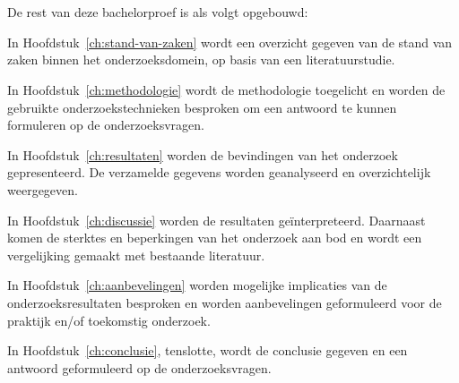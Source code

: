 \section{}%
\label{sec:opzet-bachelorproef}

De rest van deze bachelorproef is als volgt opgebouwd:

In Hoofdstuk~\ref{ch:stand-van-zaken} wordt een overzicht gegeven van de stand van zaken binnen het onderzoeksdomein, op basis van een literatuurstudie.

In Hoofdstuk~\ref{ch:methodologie} wordt de methodologie toegelicht en worden de gebruikte onderzoekstechnieken besproken om een antwoord te kunnen formuleren op de onderzoeksvragen.

In Hoofdstuk~\ref{ch:resultaten} worden de bevindingen van het onderzoek gepresenteerd. De verzamelde gegevens worden geanalyseerd en overzichtelijk weergegeven.

In Hoofdstuk~\ref{ch:discussie} worden de resultaten geïnterpreteerd. Daarnaast komen de sterktes en beperkingen van het onderzoek aan bod en wordt een vergelijking gemaakt met bestaande literatuur.

In Hoofdstuk~\ref{ch:aanbevelingen} worden mogelijke implicaties van de onderzoeksresultaten besproken en worden aanbevelingen geformuleerd voor de praktijk en/of toekomstig onderzoek.

In Hoofdstuk~\ref{ch:conclusie}, tenslotte, wordt de conclusie gegeven en een antwoord geformuleerd op de onderzoeksvragen.